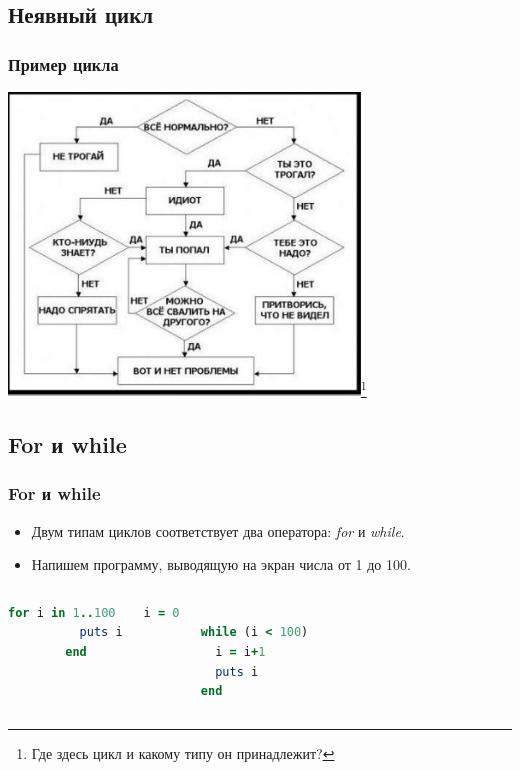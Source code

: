 \documentclass[compress,red]{beamer}
\begin{document}
\subsection{Неявный цикл}
\begin{frame}
  \frametitle{Пример цикла}
	\centerline{\includegraphics[width=0.7\textwidth]{images/how_to_fix_a_problem.png}\footnote{Где здесь цикл и какому типу он принадлежит?}}
\end{frame}

\subsection{For и while}
\begin{frame}[fragile]
  \frametitle{For и while}
		\begin{itemize}
  		\item Двум типам циклов соответствует два оператора: \emph{for} и \emph{while}.
  		\item Напишем программу, выводящую на экран числа от 1 до 100.
  	\end{itemize}
  	
    \begin{columns}[t]
    \column{2.0in}
      \begin{lstlisting}[language=ruby,numbersep=2pt,basicstyle=\footnotesize,label=ruby4,caption=for]
        for i in 1..100
          puts i
        end
      \end{lstlisting}
    \column{2.0in}
      \begin{lstlisting}[language=ruby,basicstyle=\footnotesize,label=ruby5,caption=while]
        i = 0
        while (i < 100)
          i = i+1
          puts i
        end
      \end{lstlisting}
    \end{columns}  	
\end{frame}
\end{document}
